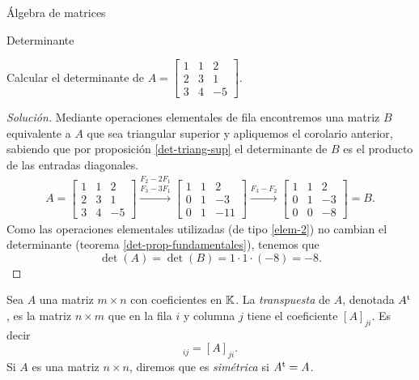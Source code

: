 \begin{chapter}{\'Algebra de matrices}
\begin{section}{Determinante}
    \begin{ejemplo*}
        Calcular el determinante de $A= \begin{bmatrix}
            1&1&2\\2&3&1\\3&4&-5
        \end{bmatrix}$.
    \end{ejemplo*}
    \begin{proof}[Solución] Mediante operaciones elementales de fila encontremos una matriz $B$ equivalente a  $A$ que sea triangular superior y apliquemos el corolario anterior,  sabiendo  que por proposición \ref{det-triang-sup} el determinante de $B$ es el producto de las entradas diagonales.  
        \begin{align*}
            A= \begin{bmatrix} 1&1&2\\2&3&1\\3&4&-5 \end{bmatrix}
            \stackrel{F_2-2F_1}{\stackrel{F_3-3F_1}{\longrightarrow}}
            \begin{bmatrix} 1&1&2\\0&1&-3\\0&1&-11 \end{bmatrix}
            \stackrel{F_3-F_2}{\longrightarrow}
            \begin{bmatrix} 1&1&2\\0&1&-3\\0&0&-8 \end{bmatrix} =B.
        \end{align*} 
    Como las operaciones elementales utilizadas (de tipo \ref{elem-2}) no cambian el determinante (teorema \ref{det-prop-fundamentales}), tenemos que
    $$
    \det(A) = \det(B) = 1 \cdot 1 \cdot (-8) = -8.
    $$ 
    \end{proof}

    \begin{definicion}\label{def-transpuesta-simetrica}
        Sea $A$ una matriz $m \times n$ con coeficientes en $\mathbb K$. La \textit{transpuesta} de $A$, denotada $A^{\operatorname{t}}$, es la matriz  $n \times m$ que en la fila $i$ y columna $j$ tiene el coeficiente $[A]_{ji}$. Es decir
        \begin{equation*}
        [A^\t]_{ij} = [A]_{ji}.
        \end{equation*} 
        Si $A$ es una matriz $n \times n$, diremos que es \textit{simétrica} si $A^{\operatorname{t}} = A$. 
    \end{definicion}
    

\end{section}
\end{chapter}
